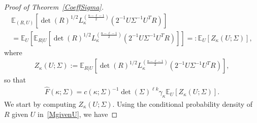\documentclass[10pt]{amsart}
\theoremstyle{definition}\newtheorem{defi}[theo]{Definition}\newtheorem{rema}[theo]{Remark}\newtheorem{exam}[theo]{Example}\newtheorem{exem}[theo]{Example}\newtheorem{nota}[theo]{Notation}
\newcommand{\EX}[2]{\mathbb{E}_{#1}\left[#2\right]}
\begin{document}
\begin{proof}[Proof of Theorem~\ref{CoeffSigma}]
\begin{multline*}
\EX{(R,U)}{ \det(R)^{1/2} L_{\kappa}^{\left(\frac{n-\ell-1}{2}\right)}\left(2^{-1}U\Sigma^{-1}U^TR\right) } \\
=\EX{U}{\EX{R|U}{\det(R)^{1/2} L_{\kappa}^{\left(\frac{n-\ell-1}{2}\right)}\left(2^{-1}U\Sigma^{-1}U^TR\right)}} =: \EX{U}{Z_{\kappa}(U;\Sigma)},
\end{multline*}
where
\begin{gather*}
Z_{\kappa}(U;\Sigma):=\EX{R|U}{\det(R)^{1/2} L_{\kappa}^{\left(\frac{n-\ell-1}{2}\right)}\left(2^{-1}U\Sigma^{-1}U^TR\right)},
\end{gather*}
so that
\begin{gather}\label{FSigma}
\widehat{F}(\kappa; \Sigma) = c(\kappa;\Sigma)^{-1} \det(\Sigma)^{\ell k} \gamma_{\kappa}
\EX{U}{Z_{\kappa}(U;\Sigma)}.
\end{gather}
We start by computing $Z_{\kappa}(U;\Sigma)$. Using the conditional probability density of $R$ given $U$ in~\eqref{MgivenU}, we have


\end{proof}
\end{document}
